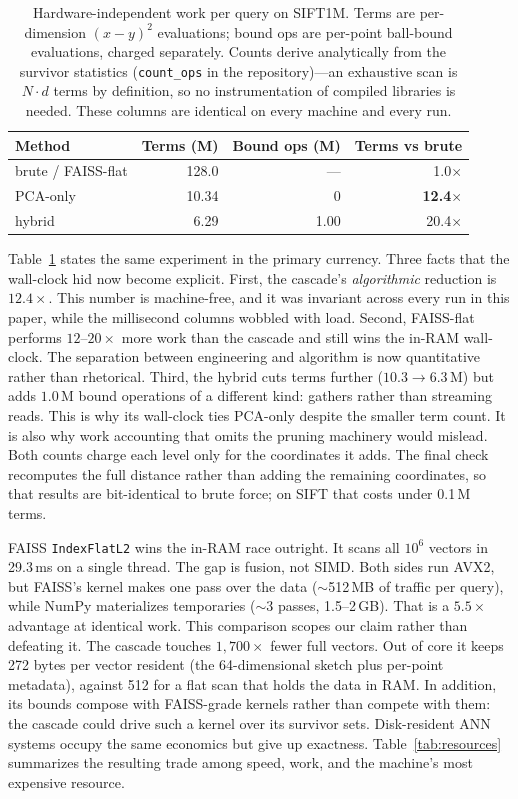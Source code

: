 \documentclass[sigconf, nonacm]{acmart}
\begin{document}
\begin{table}[t]
\caption{Hardware-independent work per query on SIFT1M. Terms are
per-dimension $(x{-}y)^2$ evaluations; bound ops are per-point ball-bound
evaluations, charged separately. Counts derive analytically from the
survivor statistics (\texttt{count\_ops} in the repository)---an exhaustive
scan is $N \cdot d$ terms by definition, so no instrumentation of compiled
libraries is needed. These columns are identical on every machine and every
run.}
\label{tab:ops}
\small
\begin{tabular}{@{}lrrr@{}}
\toprule
Method & Terms (M) & Bound ops (M) & Terms vs brute \\
\midrule
brute / FAISS-flat & 128.0 & --- & 1.0$\times$ \\
PCA-only & 10.34 & 0 & \textbf{12.4$\times$} \\
hybrid & 6.29 & 1.00 & 20.4$\times$ \\
\bottomrule
\end{tabular}
\end{table}

Table~\ref{tab:ops} states the same experiment in the primary currency.
Three facts that the wall-clock hid now become explicit. First, the
cascade's \emph{algorithmic} reduction is $12.4\times$. This number is
machine-free, and it was invariant across every run in this paper, while
the millisecond columns wobbled with load. Second, FAISS-flat performs
$12$--$20\times$ more work than the cascade and still wins the in-RAM
wall-clock. The separation between engineering and algorithm is now
quantitative rather than rhetorical. Third, the hybrid cuts terms further
($10.3 \to 6.3$\,M) but adds $1.0$\,M bound operations of a different
kind: gathers rather than streaming reads. This is why its wall-clock
ties PCA-only despite the smaller term count. It is also why work
accounting that omits the pruning machinery would mislead. Both counts
charge each level only for the coordinates it adds. The final check
recomputes the full distance rather than adding the remaining
coordinates, so that results are bit-identical to brute force; on SIFT
that costs under 0.1\,M terms.

FAISS \texttt{IndexFlatL2} wins the in-RAM race outright. It scans all
$10^6$ vectors in 29.3\,ms on a single thread. The gap is fusion, not
SIMD. Both sides run AVX2, but FAISS's kernel makes one pass over the
data ($\sim$512\,MB of traffic per query), while NumPy materializes
temporaries ($\sim$3 passes, 1.5--2\,GB). That is a $5.5\times$ advantage
at identical work. This comparison scopes our claim rather than defeating
it. The cascade touches $1{,}700\times$ fewer full vectors. Out of core
it keeps 272 bytes per vector resident (the 64-dimensional sketch plus
per-point metadata), against 512 for a flat scan that holds the data in
RAM. In
addition, its bounds compose with FAISS-grade kernels rather than compete
with them: the cascade could drive such a kernel over its survivor sets.
Disk-resident ANN systems occupy the same economics but give up
exactness. Table~\ref{tab:resources} summarizes the resulting trade among
speed, work, and the machine's most expensive resource.
\end{document}
